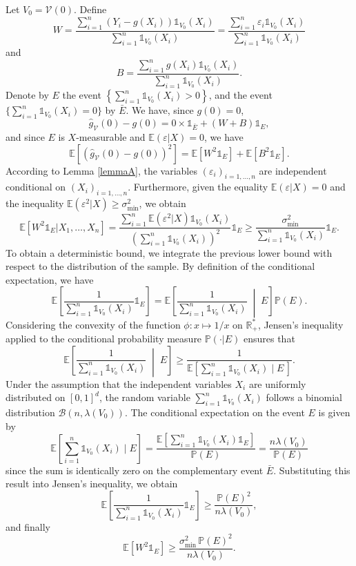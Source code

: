 \documentclass[paper=a4, fontsize=11pt]{scrartcl}
\newcommand{\ind}{\mathds{1}}
\newcommand{\PP}{\mathbb{P}}
\newcommand{\EE}{\mathbb{E}}
\begin{document}
Let $V_0 =  \mathcal V(0) $. Define
$$ W =  \frac{\sum_{i=1} ^n  (Y_i - g(X_i) ) \ind_{ V_0} (X_i)}{\sum_{i=1} ^n    \ind_{V_0 } (X_i)} =  \frac{\sum_{i=1} ^n  \varepsilon_i \ind_{ V_0} (X_i)}{\sum_{i=1} ^n    \ind_{V_0 } (X_i)}$$ and 
 $$B = \frac{\sum_{i=1} ^n  g(X_i)   \ind_{V_0 } (X_i)}{\sum_{i=1} ^n    \ind_{V_0} (X_i)}. $$
Denote by $E$ the event $\left \{ \sum_{i=1} ^n    \ind_{V_0} (X_i) > 0 \right \}$, and the event $\{ \sum_{i=1} ^n    \ind_{V_0} (X_i) = 0  \} $ by $\bar{E}$. We have, since $g(0) = 0$, 
$$\hat g_{\mathcal V}(0) - g(0) = 0 \times \ind_{\bar{E}} + (W + B) \ind_{E} , $$
and since $E$ is $X$-measurable and $\mathbb{E}(\varepsilon | X)=0$, we have
$$ \EE [ (\hat g_{\mathcal V} (0 ) -  g(0 ))^2 ]  = \EE[W^2  \ind_{E} ] + \EE [B^2  \ind_{E} ]. $$ 
According to Lemma \ref{lemmaA}, the variables $(\varepsilon_i)_{i=1,\dots,n}$ are independent conditional on $(X_i)_{i=1,\dots,n}$. Furthermore, given the equality $\EE(\varepsilon|X) = 0$ and the inequality $\EE(\varepsilon^2 | X) \geq \sigma^2_{\text{min}}$, we obtain
$$ \EE [W^2 \ind_{E} |X_1,\ldots, X_n] = \frac{\sum_{i=1} ^n  \EE(\varepsilon^2 | X)  \ind_{ V_0} (X_i)}{\left(\sum_{i=1} ^ n \ind_{ V_0 } (X_i)\right)^2 } \ind_{E} \geq \frac{\sigma^2_{\text{min}}}{\sum_{i=1} ^ n \ind_{ V_0 } (X_i) } \ind_{E}.$$
To obtain a deterministic bound, we integrate the previous lower bound with respect to the distribution of the sample. By definition of the conditional expectation, we have $$\EE \left[ \frac{1}{\sum_{i=1}^n \ind_{V_0}(X_i)} \ind_E\right] = \EE \left[ \frac{1}{\sum_{i=1}^n \ind_{V_0}(X_i)} \;\middle|\; E \right] \PP(E).$$ 
Considering the convexity of the function $\phi : x \mapsto 1/x$ on $\mathbb{R}_+^*$, Jensen's inequality applied to the conditional probability measure $\PP(\cdot | E)$ ensures that
$$\EE \left[ \frac{1}{\sum_{i=1}^n \ind_{V_0}(X_i)} \;\middle|\; E \right] \geq \frac{1}{\EE\left[\sum_{i=1}^n \ind_{V_0}(X_i) \mid E \, \right]}.$$
Under the assumption that the independent variables $X_i$ are uniformly distributed on $[0,1]^d$, the random variable $\sum_{i=1}^n \ind_{V_0}(X_i)$ follows a binomial distribution $\mathcal{B}(n, \lambda(V_0))$. The conditional expectation on the event $E$ is given by $$\EE\left[\sum_{i=1}^n \ind_{V_0}(X_i) \mid E\right] = \frac{\EE\left[\sum_{i=1}^n \ind_{V_0}(X_i) \ind_E\right]}{\PP(E)} = \frac{n \lambda(V_0)}{\PP(E)}$$ since the sum is identically zero on the complementary event $\bar{E}$. Substituting this result into Jensen's inequality, we obtain $$\EE \left[ \frac{1}{\sum_{i=1}^n \ind_{V_0}(X_i)} \ind_E\right] \geq \frac{\PP(E)^2}{n \lambda(V_0)},$$
and finally $$\EE[W^2  \ind_{E} ] \geq \frac{\sigma^2_{\text{min}} \, \PP(E)^2}{n \lambda(V_0)}.$$
\end{document}
